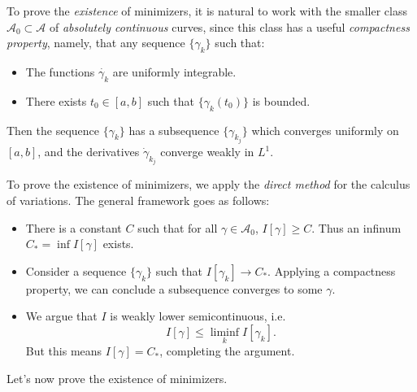 To prove the \emph{existence} of minimizers, it is natural to work with the smaller class $\mathcal{A}_0 \subset \mathcal{A}$ of \emph{absolutely continuous} curves, since this class has a useful \emph{compactness property}, namely, that any sequence $\{ \gamma_k \}$ such that:
%
\begin{itemize}
    \item The functions $\dot{\gamma_k}$ are uniformly integrable.

    \item There exists $t_0 \in [a,b]$ such that $\{ \gamma_k(t_0) \}$ is bounded.
\end{itemize}
%
Then the sequence $\{ \gamma_k \}$ has a subsequence $\{ \gamma_{k_j} \}$ which converges uniformly on $[a,b]$, and the derivatives $\dot{\gamma}_{k_j}$ converge weakly in $L^1$.

To prove the existence of minimizers, we apply the \emph{direct method} for the calculus of variations. The general framework goes as follows:
%
\begin{itemize}
    \item There is a constant $C$ such that for all $\gamma \in \mathcal{A}_0$, $I[\gamma] \geq C$. Thus an infinum $C_* = \inf I[\gamma]$ exists.

    \item Consider a sequence $\{ \gamma_k \}$ such that $I[\gamma_k] \to C_*$. Applying a compactness property, we can conclude a subsequence converges to some $\gamma$.

    \item We argue that $I$ is weakly lower semicontinuous, i.e.
    \[ I[\gamma] \leq \liminf_k I[\gamma_k]. \]
    But this means $I[\gamma] = C_*$, completing the argument.
\end{itemize}
%
Let's now prove the existence of minimizers.

